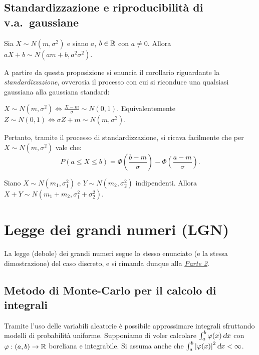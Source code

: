 \begin{multicols*}{2}
\subsection{Standardizzazione e riproducibilità di v.a.~gaussiane}

\begin{proposition}
    Sia $X \sim N(m, \sigma^2)$ e siano $a$, $b \in \mathbb{R}$ con $a \neq 0$. Allora
    $aX + b \sim N(am+b, a^2 \sigma^2)$.
\end{proposition}

A partire da questa proposizione si enuncia il corollario riguardante la
\textit{standardizzazione}, ovverosia il processo con cui si riconduce una
qualsiasi gaussiana alla gaussiana standard:

\begin{corollary}[Standardizzazione]
    $X \sim N(m, \sigma^2) \iff \frac{X-m}{\sigma} \sim N(0, 1)$. Equivalentemente
    $Z \sim N(0, 1) \iff \sigma Z + m \sim N(m, \sigma^2)$. 
\end{corollary}

\begin{remark}
    Pertanto, tramite il processo di standardizzazione, si ricava facilmente che
    per $X \sim N(m, \sigma^2)$ vale che:
    \[
        P(a \leq X \leq b) = \Phi\left(\frac{b-m}{\sigma}\right) - \Phi\left(\frac{a-m}{\sigma}\right).
    \]
\end{remark}

\begin{proposition}
    Siano $X \sim N(m_1, \sigma_1^2)$ e $Y \sim N(m_2, \sigma_2^2)$ indipendenti. Allora
    $X+Y \sim N(m_1 + m_2, \sigma_1^2 + \sigma_2^2)$.
\end{proposition}

\section{Legge dei grandi numeri (LGN)}

La legge (debole) dei grandi numeri segue lo stesso enunciato (e la stessa dimostrazione) del caso
discreto, e si rimanda dunque alla \hyperref[sec:lgn]{\textit{Parte 2}}.

\subsection{Metodo di Monte-Carlo per il calcolo di integrali}

Tramite l'uso delle variabili aleatorie è possibile approssimare integrali sfruttando
modelli di probabilità uniforme. Supponiamo di voler calcolare $\int_a^b \varphi(x) \dx$ con
$\varphi : (a, b) \to \mathbb{R}$ boreliana e integrabile. Si assuma anche che
$\int_a^b \abs{\varphi(x)}^2 \dx < \infty$. \smallskip


\end{multicols*}
